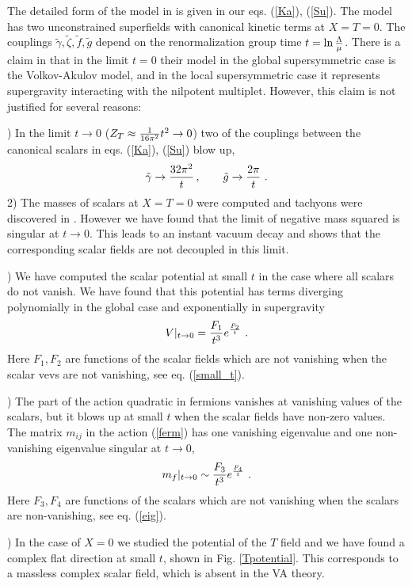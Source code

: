 \documentclass[11pt]{article}
\newcommand{\be}{\begin{equation}}
\newcommand{\ee}{\end{equation}}
\newcommand{\rf}[1]{(\ref{#1})}
\def\be{\begin{equation}}
\def\ee{\end{equation}}
\begin{document}
The detailed form of the model in \cite{DallAgata:2022abm} is given in our eqs. \rf{Ka}, \rf{Su}. The model has two unconstrained superfields with canonical kinetic terms at $X=T=0$. The couplings $\tilde \gamma, \tilde \zeta, \tilde f, \tilde g$ depend on the renormalization group time $t= \ln {\Lambda\over \mu}$. There is a claim in  \cite{DallAgata:2022abm} that in the limit $t=0$ their model in the global supersymmetric case is the Volkov-Akulov model, and in the local supersymmetric case it represents supergravity interacting with the nilpotent multiplet. However, this claim is not justified for several reasons: 

) In the limit $t\to 0$ ($Z_T \approx {1\over 16 \pi^2}  t^2 \to 0$) two of the couplings between the canonical scalars in  eqs. \rf{Ka}, \rf{Su} blow up,
\be
\tilde \gamma  \rightarrow {32 \pi^2\over   t}\, , \qquad 
\tilde g \rightarrow {2\pi\over   t} \ .
\label{small}\ee  
2)   The masses of  scalars  at $X=T=0$ were computed and tachyons were discovered in \cite{DallAgata:2022abm}. 
However we have found that the limit of negative mass squared is singular at
 $t\to 0$. This leads to an instant vacuum decay and shows that the corresponding scalar fields are not decoupled in this limit.
 
 ) We have computed
the scalar potential at small $t$ in the case where all scalars do not vanish. We have found   that this potential has terms diverging  polynomially in the global case and exponentially in supergravity
\be
V |_{t \to  0} =  {F_1 \over  t^3}  e^{F_2\over t}   \ .
\label{smalt}\ee
Here $F_1, F_2$ are functions of the scalar fields which are not vanishing when the scalar vevs are not vanishing, see eq. \rf{small_t}.

 ) The part of the action quadratic in fermions vanishes at vanishing values of the scalars,  but it blows up at small $t$ when the scalar fields have non-zero values. The matrix $m_{ij}$ in the action \rf{ferm}  has one vanishing eigenvalue and one non-vanishing eigenvalue singular at $t\to 0$,
\be
m_f |_{t \to  0}\sim {F_3\over t^3}    e^{  F_4 \over  t} \ .
\label{fermC}\ee
Here $F_3, F_4$ are functions of the scalars which are not vanishing when the scalars are non-vanishing, see eq. \rf{eig}.

 ) In the case of $X=0$ we studied the potential of the $T$ field and we have found a complex flat direction at small $t$, shown in Fig. \ref{Tpotential}. This corresponds to  a massless complex scalar  field, which is absent in the VA theory.
\end{document}
